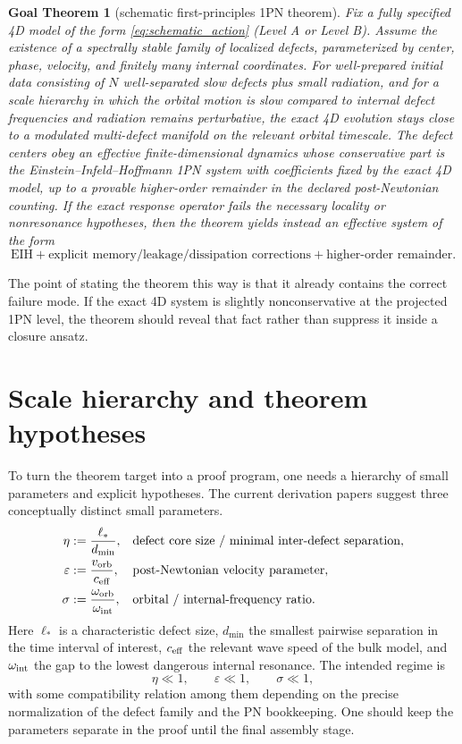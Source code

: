 \documentclass[11pt]{article}
\newcommand{\eps}{\varepsilon}
\newtheorem{goal}{Goal Theorem}
\begin{document}
\begin{goal}[schematic first-principles 1PN theorem]
Fix a fully specified 4D model of the form \eqref{eq:schematic_action} (Level A or Level B). Assume the existence of a spectrally stable family of localized defects, parameterized by center, phase, velocity, and finitely many internal coordinates. For well-prepared initial data consisting of $N$ well-separated slow defects plus small radiation, and for a scale hierarchy in which the orbital motion is slow compared to internal defect frequencies and radiation remains perturbative, the exact 4D evolution stays close to a modulated multi-defect manifold on the relevant orbital timescale. The defect centers obey an effective finite-dimensional dynamics whose conservative part is the Einstein--Infeld--Hoffmann 1PN system with coefficients fixed by the exact 4D model, up to a provable higher-order remainder in the declared post-Newtonian counting. If the exact response operator fails the necessary locality or nonresonance hypotheses, then the theorem yields instead an effective system of the form
\begin{equation}
  \text{EIH} + \text{explicit memory/leakage/dissipation corrections} + \text{higher-order remainder}.
\end{equation}
\end{goal}

The point of stating the theorem this way is that it already contains the correct failure mode. If the exact 4D system is slightly nonconservative at the projected 1PN level, the theorem should reveal that fact rather than suppress it inside a closure ansatz.

\section{Scale hierarchy and theorem hypotheses}
\label{sec:scales}

To turn the theorem target into a proof program, one needs a hierarchy of small parameters and explicit hypotheses. The current derivation papers suggest three conceptually distinct small parameters.
\begin{align}
  \eta &:= \frac{\ell_{\ast}}{d_{\min}},
  &&\text{defect core size / minimal inter-defect separation},
  \\
  \eps &:= \frac{v_{\rm orb}}{c_{\rm eff}},
  &&\text{post-Newtonian velocity parameter},
  \\
  \sigma &:= \frac{\omega_{\rm orb}}{\omega_{\rm int}},
  &&\text{orbital / internal-frequency ratio}.
\end{align}
Here $\ell_{\ast}$ is a characteristic defect size, $d_{\min}$ the smallest pairwise separation in the time interval of interest, $c_{\rm eff}$ the relevant wave speed of the bulk model, and $\omega_{\rm int}$ the gap to the lowest dangerous internal resonance. The intended regime is
\begin{equation}
  \eta \ll 1,
  \qquad
  \eps \ll 1,
  \qquad
  \sigma \ll 1,
\end{equation}
with some compatibility relation among them depending on the precise normalization of the defect family and the PN bookkeeping. One should keep the parameters separate in the proof until the final assembly stage.
\end{document}
